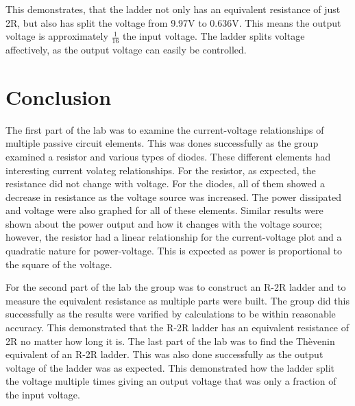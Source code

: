 \documentclass[twocolumn, amsmath]{revtex4}
\begin{document}
This demonstrates, that the ladder not only has an equivalent resistance of just 2R, but also has split the voltage from 9.97V to 0.636V. This means the output voltage is approximately $\frac{1}{16}$ the input voltage. The ladder splits voltage affectively, as the output voltage can easily be controlled.

\newpage

\section{Conclusion}

The first part of the lab was to examine the current-voltage relationships of multiple passive circuit elements. This was dones successfully as the group examined a resistor and various types of diodes. These different elements had interesting current volateg relationships. For the resistor, as expected, the resistance did not change with voltage. For the diodes, all of them showed a decrease in resistance as the voltage source was increased. The power dissipated and voltage were also graphed for all of these elements. Similar results were shown about the power output and how it changes with the voltage source; however, the resistor had a linear relationship for the current-voltage plot and a quadratic nature for power-voltage. This is expected as power is proportional to the square of the voltage.

\vspace{.8cm}

For the second part of the lab the group was to construct an R-2R ladder and to measure the equivalent resistance as multiple parts were built. The group did this successfully as the results were varified by calculations to be within reasonable accuracy. This demonstrated that the R-2R ladder has an equivalent resistance of 2R no matter how long it is. The last part of the lab was to find the Th\`{e}venin equivalent of an R-2R ladder. This was also done successfully as the output voltage of the ladder was as expected. This demonstrated how the ladder split the voltage multiple times giving an output voltage that was only a fraction of the input voltage.
\end{document}
